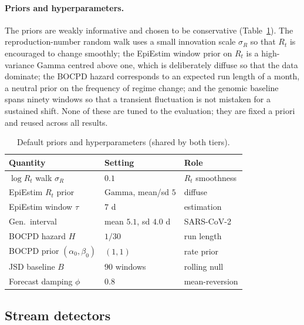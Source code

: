 \documentclass[10pt,twocolumn]{article}
\theoremstyle{definition}
\newcommand{\Rt}{R_t}
\newcommand{\Gam}{\mathrm{Gamma}}
\begin{document}
\paragraph{Priors and hyperparameters.}
The priors are weakly informative and chosen to be conservative
(Table~\ref{tab:priors}). The reproduction-number random walk uses a small
innovation scale $\sigma_R$ so that $\Rt$ is encouraged to change smoothly; the
EpiEstim window prior on $\Rt$ is a high-variance Gamma centred above one, which
is deliberately diffuse so that the data dominate; the BOCPD hazard corresponds
to an expected run length of a month, a neutral prior on the frequency of regime
change; and the genomic baseline spans ninety windows so that a transient
fluctuation is not mistaken for a sustained shift. None of these are tuned to the
evaluation; they are fixed a priori and reused across all results.

\begin{table}[t]
\centering\footnotesize
\caption{Default priors and hyperparameters (shared by both tiers).}
\label{tab:priors}
\begin{tabular}{@{}lll@{}}
\toprule
Quantity & Setting & Role \\
\midrule
$\log\Rt$ walk $\sigma_R$ & $0.1$ & $\Rt$ smoothness \\
EpiEstim $\Rt$ prior & $\Gam$, mean/sd $5$ & diffuse \\
EpiEstim window $\tau$ & $7$ d & estimation \\
Gen.\ interval & mean $5.1$, sd $4.0$ d & SARS-CoV-2 \\
BOCPD hazard $H$ & $1/30$ & run length \\
BOCPD prior $(\alpha_0,\beta_0)$ & $(1,1)$ & rate prior \\
JSD baseline $B$ & $90$ windows & rolling null \\
Forecast damping $\phi$ & $0.8$ & mean-reversion \\
\bottomrule
\end{tabular}
\end{table}

\subsection{Stream detectors}
\label{sec:detectors}
\end{document}
